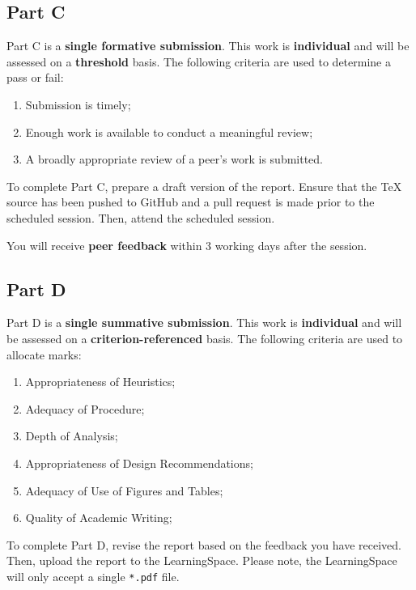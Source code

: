 \documentclass{../fal_assignment}
\begin{document}
\subsection*{Part C}

Part C is a \textbf{single formative submission}. This work is \textbf{individual} and will be assessed on a \textbf{threshold} basis. The following criteria are used to determine a pass or fail:

\begin{enumerate}[label=(\alph*)]
	\item Submission is timely;
	\item Enough work is available to conduct a meaningful review;
	\item A broadly appropriate review of a peer's work is submitted.
\end{enumerate}

To complete Part C, prepare a draft version of the report. Ensure that the TeX source has been pushed to GitHub and a pull request is made prior to the scheduled session. Then, attend the scheduled session.

You will receive \textbf{peer feedback} within 3 working days after the session.

\subsection*{Part D}

Part D is a \textbf{single summative submission}. This work is \textbf{individual} and will be assessed on a \textbf{criterion-referenced} basis. The following criteria are used to allocate marks:

\begin{enumerate}[label=(\alph*)]
	\item Appropriateness of Heuristics;
	\item Adequacy of Procedure;
	\item Depth of Analysis;
	\item Appropriateness of Design Recommendations;
	\item Adequacy of Use of Figures and Tables;
	\item Quality of Academic Writing;
\end{enumerate}

To complete Part D, revise the report based on the feedback you have received. Then, upload the report to the LearningSpace. Please note, the LearningSpace will only accept a single \texttt{*.pdf} file.
\end{document}
